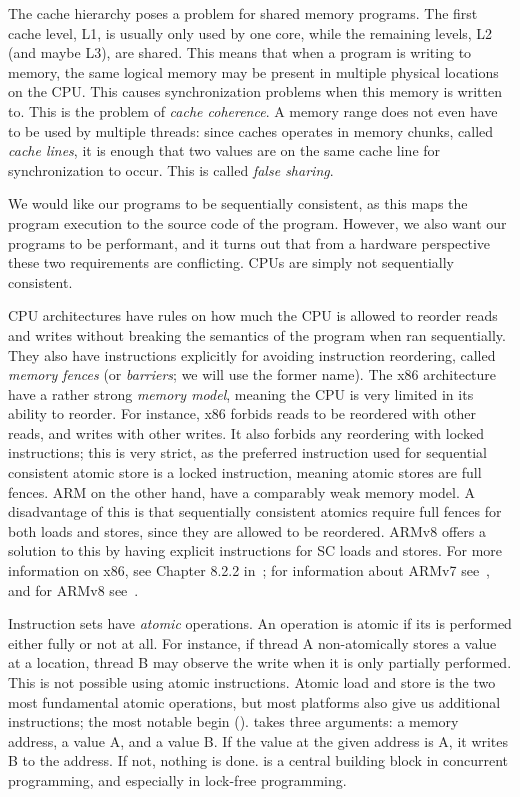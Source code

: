 \documentclass[b5paper]{report}
\begin{document}
The cache hierarchy poses a problem for shared memory programs. The first cache
level, L1, is usually only used by one core, while the remaining levels, L2 (and
maybe L3), are shared. This means that when a program is writing to memory, the
same logical memory may be present in multiple physical locations on the CPU.\@
This causes synchronization problems when this memory is written to. This is the
problem of \emph{cache coherence}. A memory range does not even have to be used
by multiple threads: since caches operates in memory chunks, called \emph{cache
lines}, it is enough that two values are on the same cache line for
synchronization to occur. This is called \emph{false sharing}.

We would like our programs to be sequentially consistent, as this maps the
program execution to the source code of the program. However, we also want our
programs to be performant, and it turns out that from a hardware perspective
these two requirements are conflicting. CPUs are simply not sequentially
consistent.

CPU architectures have rules on how much the CPU is allowed to reorder reads and
writes without breaking the semantics of the program when ran sequentially. They
also have instructions explicitly for avoiding instruction reordering, called
\emph{memory fences} (or \emph{barriers}; we will use the former name). The x86
architecture have a rather strong \emph{memory model}, meaning the CPU is very
limited in its ability to reorder.  For instance, x86 forbids reads to be
reordered with other reads, and writes with other writes. It also forbids any
reordering with locked instructions; this is very strict, as the preferred
instruction used for sequential consistent atomic store is a locked instruction,
meaning atomic stores are full fences. ARM on the other hand, have a comparably
weak memory model. A disadvantage of this is that sequentially consistent
atomics require full fences for both loads and stores, since they are allowed to
be reordered. ARMv8 offers a solution to this by having explicit instructions
for SC loads and stores. For more information on x86, see Chapter 8.2.2
in~\cite{intel64}; for information about ARMv7 see~\cite{armv7-reference-manual},
and for ARMv8 see~\cite{armv8-reference-manual}.

Instruction sets have \emph{atomic} operations. An operation is atomic if its is
performed either fully or not at all. For instance, if thread A non-atomically
stores a value at a location, thread B may observe the write when it is only
partially performed. This is not possible using atomic instructions.  Atomic
load and store is the two most fundamental atomic operations, but most platforms
also give us additional instructions; the most notable begin
 ().  takes three arguments: a memory
address, a value A, and a value B. If the value at the given address is A, it
writes B to the address. If not, nothing is done.  is a central
building block in concurrent programming, and especially in lock-free
programming.
\end{document}
